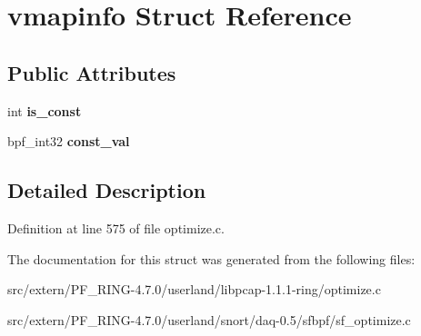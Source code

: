 \hypertarget{structvmapinfo}{
\section{vmapinfo Struct Reference}
\label{structvmapinfo}
}
\subsection*{Public Attributes}
\begin{DoxyCompactItemize}
\item 
\hypertarget{structvmapinfo_acb1292ff5e9f44819c613d68502a2c36}{
int {\bfseries is\_\-const}}
\label{structvmapinfo_acb1292ff5e9f44819c613d68502a2c36}

\item 
\hypertarget{structvmapinfo_a68abc8a059445ba5220f2b377e4ece0d}{
bpf\_\-int32 {\bfseries const\_\-val}}
\label{structvmapinfo_a68abc8a059445ba5220f2b377e4ece0d}

\end{DoxyCompactItemize}


\subsection{Detailed Description}


Definition at line 575 of file optimize.c.



The documentation for this struct was generated from the following files:\begin{DoxyCompactItemize}
\item 
src/extern/PF\_\-RING-\/4.7.0/userland/libpcap-\/1.1.1-\/ring/optimize.c\item 
src/extern/PF\_\-RING-\/4.7.0/userland/snort/daq-\/0.5/sfbpf/sf\_\-optimize.c\end{DoxyCompactItemize}
